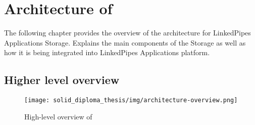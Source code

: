 \chapter{Architecture of \lpa{}}
\label{chap:num_4}

The following chapter provides the overview of the architecture for LinkedPipes Applications Storage. Explains the main components of the Storage as well as how it is being integrated into LinkedPipes Applications platform.

\section{Higher level overview}


\begin{figure}[h]
\centering
\texttt{[image: solid\_diploma\_thesis/img/architecture-overview.png]}
\caption{High-level overview of \lpa}
\label{fig:high-level-arch}
\end{figure}